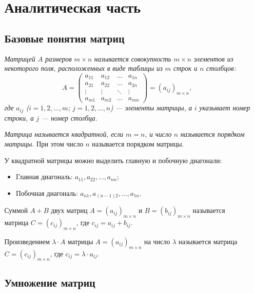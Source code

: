\section{Аналитическая часть}

\subsection{Базовые понятия матриц}

\hspace{1.25cm}
\textit{Матрицей $A$ размеров $m \times n$ называется совокупность $m \times n$ элементов из некоторого поля, расположенных в виде таблицы из $m$ строк и $n$ столбцов:}
    \[
    A = 
    \begin{pmatrix}
    a_{11} & a_{12} & \dots & a_{1n} \\
    a_{21} & a_{22} & \dots & a_{2n} \\
    \vdots & \vdots & \ddots & \vdots \\
    a_{m1} & a_{m2} & \dots & a_{mn}
    \end{pmatrix} = (a_{ij})_{m \times n},
    \]
    \textit{где $a_{ij}$ ($i = 1, 2, \dots, m$; $j = 1, 2, \dots, n$) — элементы матрицы, а $i$ указывает номер строки, а $j$ — номер столбца.}

    \textit{Матрица называется квадратной, если $m = n$, и число $n$ называется порядком матрицы.}
При этом число $n$ называется порядком матрицы.

У квадратной матрицы можно выделить главную и побочную диагонали:
\begin{itemize}
    \item Главная диагональ: $a_{11}, a_{22}, \dots, a_{nn}$;
    \item Побочная диагональ: $a_{n1}, a_{(n-1)2}, \dots, a_{1n}$.
\end{itemize}

Суммой $A + B$ двух матриц $A = (a_{ij})_{m \times n}$ и $B = (b_{ij})_{m \times n}$ называется матрица $C = (c_{ij})_{m \times n}$, где $c_{ij} = a_{ij} + b_{ij}$.

Произведением $\lambda \cdot A$ матрицы $A = (a_{ij})_{m \times n}$ на число $\lambda$ называется матрица $C = (c_{ij})_{m \times n}$, где $c_{ij} = \lambda \cdot a_{ij}$. \cite{nikitenko}

\subsection{Умножение матриц}

